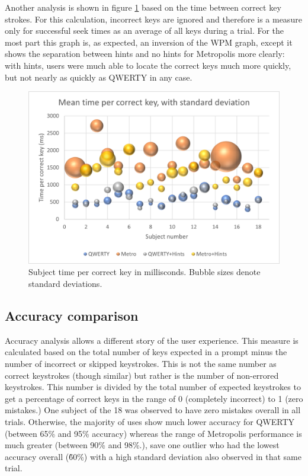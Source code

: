 \documentclass[english]{vgtc}
\begin{document}
Another analysis is shown in figure \ref{fig:keytime} based on the time between correct key strokes.
For this calculation, incorrect keys are ignored and therefore is a measure only for successful seek
times as an average of all keys during a trial.  For the most part this graph is, as expected, an
inversion of the WPM graph, except it shows the separation between hints and no hints for Metropolis
more clearly: with hints, users were much able to locate the correct keys much more quickly, but not
nearly as quickly as QWERTY in any case.

\begin{figure}
  \centering
  \includegraphics[width=0.95\columnwidth]{time-per-key.png}
  \caption{Subject time per correct key in millisconds. Bubble sizes denote standard deviations.}
  \label{fig:keytime}
\end{figure}

\subsection{Accuracy comparison}

Accuracy analysis allows a different story of the user experience.  This measure is calculated based on the
total number of keys expected in a prompt minus the number of incorrect or skipped keystrokes. This is not
the same number as correct keystrokes (though similar) but rather is the number of non-errored keystrokes.
This number is divided by the total number of expected keystrokes to get a percentage of correct keys in the
range of 0 (completely incorrect) to 1 (zero mistakes.)  One subject of the 18 was observed to have zero mistakes
overall in all trials.  Otherwise, the majority of uses show much lower accuracy for QWERTY (between 65\% and 95\% accuracy)
whereas the range of Metropolis performance is much greater (between 90\% and 98\%.), save one outlier
who had the lowest accuracy overall (\~60\%) with a high standard deviation also observed in that same trial.
\end{document}
